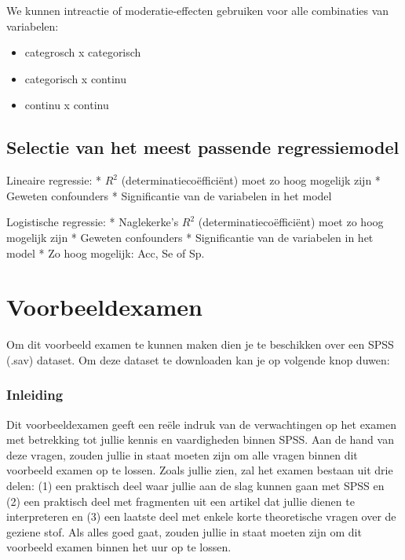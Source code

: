 \documentclass[
]{book}
\providecommand{\tightlist}{%
  \setlength{\itemsep}{0pt}\setlength{\parskip}{0pt}}
\theoremstyle{definition}
\theoremstyle{definition}
\theoremstyle{definition}
\theoremstyle{definition}
\theoremstyle{remark}
\begin{document}
We kunnen intreactie of moderatie-effecten gebruiken voor alle combinaties van variabelen:

\begin{itemize}
\tightlist
\item
  categrosch x categorisch
\item
  categorisch x continu
\item
  continu x continu
\end{itemize}

\hypertarget{selectie-van-het-meest-passende-regressiemodel}{%
\section*{Selectie van het meest passende regressiemodel}\label{selectie-van-het-meest-passende-regressiemodel}}


Lineaire regressie: * \(R^2\) (determinatiecoëfficiënt) moet zo hoog mogelijk zijn * Geweten confounders * Significantie van de variabelen in het model

Logistische regressie: * Naglekerke's \(R^2\) (determinatiecoëfficiënt) moet zo hoog mogelijk zijn * Geweten confounders * Significantie van de variabelen in het model * Zo hoog mogelijk: Acc, Se of Sp.

\mainmatter

\hypertarget{exam}{%
\chapter{Voorbeeldexamen}\label{exam}}

Om dit voorbeeld examen te kunnen maken dien je te beschikken over een SPSS (.sav) dataset. Om deze dataset te downloaden kan je op volgende knop duwen:

\hypertarget{inleiding-3}{%
\subsection*{Inleiding}\label{inleiding-3}}


Dit voorbeeldexamen geeft een reële indruk van de verwachtingen op het examen met betrekking tot jullie kennis en vaardigheden binnen SPSS. Aan de hand van deze vragen, zouden jullie in staat moeten zijn om alle vragen binnen dit voorbeeld examen op te lossen. Zoals jullie zien, zal het examen bestaan uit drie delen: (1) een praktisch deel waar jullie aan de slag kunnen gaan met SPSS en (2) een praktisch deel met fragmenten uit een artikel dat jullie dienen te interpreteren en (3) een laatste deel met enkele korte theoretische vragen over de geziene stof. Als alles goed gaat, zouden jullie in staat moeten zijn om dit voorbeeld examen binnen het uur op te lossen.
\end{document}
